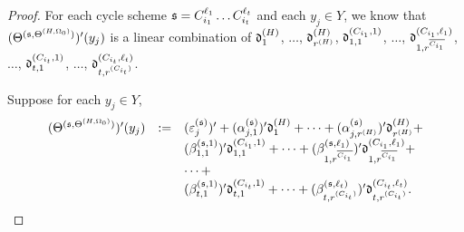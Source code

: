 \begin{appendix}
\begin{proof}
For each cycle scheme ${\mathfrak{s} }=C^{\ell_1}_{i_1} \dots C^{\ell_t}_{i_t}$ and each $y_j \in Y$, we know that $(\Theta^{({\mathfrak{s} },\Theta^{(H,\Omega_0)})})'(y_j)$ is a linear combination of $\mathfrak{d}^{(H)}_1$, $\dots$, $\mathfrak{d}^{(H)}_{r^{(H)}}$, $\mathfrak{d}^{(C_{i_1},1)}_{1,1}$, $\dots$, $\mathfrak{d}^{(C_{i_1},\ell_1)}_{1,r^{\overline{C_{i_1}}}}$, $\dots$, $\mathfrak{d}^{(C_{i_t},1)}_{t,1}$, $\dots$, $\mathfrak{d}^{(C_{i_t},\ell_t)}_{t, r^{(C_{i_t})}}$. 


Suppose for each $y_j \in Y$,
\[
\begin{array}{l cl }
(\Theta^{({\mathfrak{s} },\Theta^{(H,\Omega_0)})})'(y_j) &:= & (\varepsilon^{({\mathfrak{s} })}_{j})'  + (\alpha^{({\mathfrak{s} })}_{j,1})' \mathfrak{d}^{(H)}_1 + \dots + (\alpha^{({\mathfrak{s} })}_{j,r^{(H)}})' \mathfrak{d}^{(H)}_{r^{(H)}} + \\
& & (\beta^{({\mathfrak{s} },1)}_{1,1})' \mathfrak{d}^{(C_{i_1},1)}_{1,1}  + \dots + (\beta^{({\mathfrak{s} },\ell_1)}_{1,r^{\overline{C_{i_1}}}})' \mathfrak{d}^{(C_{i_1},\ell_1)}_{1,r^{\overline{C_{i_1}}}}  +  \\
& & \dots + \\
& & (\beta^{({\mathfrak{s} },1)}_{t,1})' \mathfrak{d}^{(C_{i_{t}},1)}_{t,1} + \dots + (\beta^{({\mathfrak{s} },\ell_{t})}_{t,r^{(C_{i_{t}})}})' \mathfrak{d}^{(C_{i_{t}},\ell_{t})}_{t, r^{(C_{i_{t}})}}.
\end{array}
\]




\end{proof}
\end{appendix}
